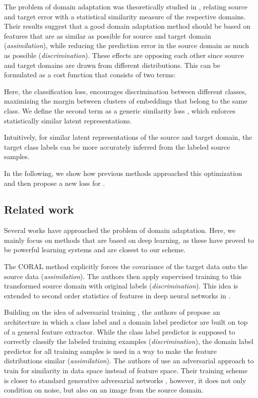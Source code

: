\documentclass[10pt,twocolumn,letterpaper]{article}
\begin{document}
The problem of domain adaptation was theoretically studied in \cite{Ben-David2010}, relating source and target error with a statistical similarity measure of the respective domains.
Their results suggest that a good domain adaptation method should be based on features that are as similar as possible for source and target domain (\emph{assimilation}), while reducing the prediction error in the source domain as much as possible (\emph{discrimination}).
These effects are opposing each other since source and target domains are drawn from different distributions. This can be formulated as a cost function that consists of two terms:



Here, the classification loss,  encourages discrimination between different classes, maximizing the margin between clusters of embeddings that belong to the same class.
We define the second term as a generic similarity loss , which enforces statistically similar latent representations.

Intuitively, for similar latent representations of the source and target domain, the target class labels can be more accurately inferred from the labeled source samples.

In the following, we show how previous methods approached this optimization and then propose a new loss for .

\subsection{Related work} \label{sec:related_work}
Several works have approached the problem of domain adaptation.
Here, we mainly focus on methods that are based on deep learning, as these have proved to be powerful learning systems and are closest to our scheme.

The CORAL method \cite{Sun2016b} explicitly forces the covariance of the target data onto the source data (\emph{assimilation}).
The authors then apply supervised training to this transformed source domain with original labels (\emph{discrimination}).
This idea is extended to second order statistics of features in deep neural networks in \cite{Sun2016}.

Building on the idea of adversarial training \cite{Goodfellow2014a}, the authors of \cite{Ganin2015a} propose an architecture in which a class label and a domain label predictor are built on top of a general feature extractor. 
While the class label predictor is supposed to correctly classify the labeled training examples (\emph{discrimination}), the domain label predictor for all training samples is used in a way to make the feature distributions similar (\emph{assimilation}).
The authors of \cite{Bousmalis2016b} use an adversarial approach to train for similarity in data space instead of feature space.
Their training scheme is closer to standard generative adversarial networks \cite{Goodfellow2014a}, however, it does not only condition on noise, but also on an image from the source domain.
 
\end{document}
